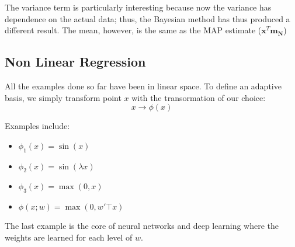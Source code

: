 \documentclass{article}
\renewcommand{\v}{\boldsymbol}
\begin{document}
	The variance term is particularly interesting because now the variance has dependence on the actual data; thus, the Bayesian method has thus produced a different result. The mean, however, is the same as the MAP estimate ($\v{x}^T \v{m_N}$)

\subsection{Non Linear Regression}

All the examples done so far have been in linear space. To define an adaptive basis, we simply transform point $x$ with the transormation of our choice:
$$x \to \phi(x)$$

Examples include:
\begin{itemize}
\item $\phi_1(x) = \sin(x)$
\item $\phi_2(x) = \sin(\lambda x)$
\item $\phi_3(x) = \max(0, x)$
\item $\phi(x; w) = \max(0, w'\top x)$
\end{itemize}
The last example is the core of neural networks and deep learning where the weights are learned for each level of $w$.
\end{document}
